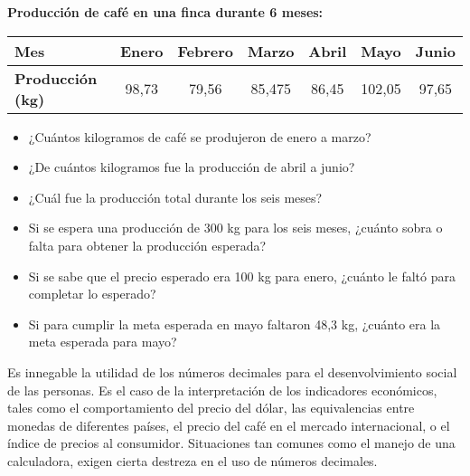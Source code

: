 \documentclass[12pt,a4paper]{article}
\begin{document}
\vspace{0.5cm}

\textbf{Producción de café en una finca durante 6 meses:}

\begin{center}
\begin{tabular}{|l|c|c|c|c|c|c|}
\hline
\textbf{Mes} & Enero & Febrero & Marzo & Abril & Mayo & Junio \\
\hline
\textbf{Producción (kg)} & 98,73 & 79,56 & 85,475 & 86,45 & 102,05 & 97,65 \\
\hline
\end{tabular}
\end{center}

\vspace{0.5cm}

\begin{itemize}
\item ¿Cuántos kilogramos de café se produjeron de enero a marzo?
\item ¿De cuántos kilogramos fue la producción de abril a junio?
\item ¿Cuál fue la producción total durante los seis meses?
\item Si se espera una producción de 300 kg para los seis meses, ¿cuánto sobra o falta para obtener la producción esperada?
\item Si se sabe que el precio esperado era 100 kg para enero, ¿cuánto le faltó para completar lo esperado?
\item Si para cumplir la meta esperada en mayo faltaron 48,3 kg, ¿cuánto era la meta esperada para mayo?
\end{itemize}

\vspace{1cm}

\begin{tcolorbox}[colback=fondoazul,colframe=azuloscuro,breakable]
Es innegable la utilidad de los números decimales para el desenvolvimiento social de las personas. Es el caso de la interpretación de los indicadores económicos, tales como el comportamiento del precio del dólar, las equivalencias entre monedas de diferentes países, el precio del café en el mercado internacional, o el índice de precios al consumidor. Situaciones tan comunes como el manejo de una calculadora, exigen cierta destreza en el uso de números decimales.
\end{tcolorbox}

\vspace{1cm}
\end{document}
